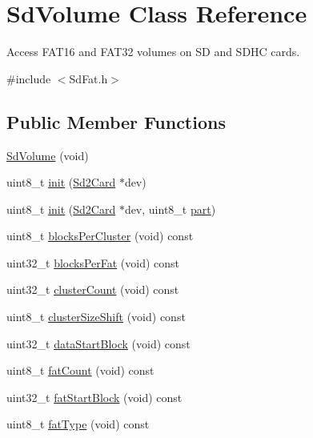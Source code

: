 \hypertarget{class_sd_volume}{}\section{Sd\+Volume Class Reference}
\label{class_sd_volume}


Access F\+A\+T16 and F\+A\+T32 volumes on SD and S\+D\+HC cards.  




{\ttfamily \#include $<$Sd\+Fat.\+h$>$}

\subsection*{Public Member Functions}
\begin{DoxyCompactItemize}
\item 
\hyperlink{class_sd_volume_a1843d58062920d6d0e122892ffa42923}{Sd\+Volume} (void)
\item 
uint8\+\_\+t \hyperlink{class_sd_volume_adfcf83cba537b831f3a993a058e7ca85}{init} (\hyperlink{class_sd2_card}{Sd2\+Card} $\ast$dev)
\item 
uint8\+\_\+t \hyperlink{class_sd_volume_a8f5879e458ea6f1a2a2a2b884d800550}{init} (\hyperlink{class_sd2_card}{Sd2\+Card} $\ast$dev, uint8\+\_\+t \hyperlink{_fat_structs_8h_aa65f87792f271fc6cfa70980af6ac3dd}{part})
\item 
uint8\+\_\+t \hyperlink{class_sd_volume_ad6cb99a5d4e9e53651297b999eb2256f}{blocks\+Per\+Cluster} (void) const
\item 
uint32\+\_\+t \hyperlink{class_sd_volume_a783bfc6ced6f6af86c1e94d394ebe76c}{blocks\+Per\+Fat} (void) const
\item 
uint32\+\_\+t \hyperlink{class_sd_volume_a9d70b14b7bd7cb07d4c90e854283aed9}{cluster\+Count} (void) const
\item 
uint8\+\_\+t \hyperlink{class_sd_volume_a7cdcb6e4c187c96b1b536f9bc587c659}{cluster\+Size\+Shift} (void) const
\item 
uint32\+\_\+t \hyperlink{class_sd_volume_a8e6813781321490fad895ce7b16a8638}{data\+Start\+Block} (void) const
\item 
uint8\+\_\+t \hyperlink{class_sd_volume_ad0985d6a2a136aedacd7678977b0e015}{fat\+Count} (void) const
\item 
uint32\+\_\+t \hyperlink{class_sd_volume_a05f8847162b9d9f77b1b8db95cd63cec}{fat\+Start\+Block} (void) const
\item 
uint8\+\_\+t \hyperlink{class_sd_volume_a85adb29d404b08b1b58e9f105b60ea8d}{fat\+Type} (void) const

\end{DoxyCompactItemize}

